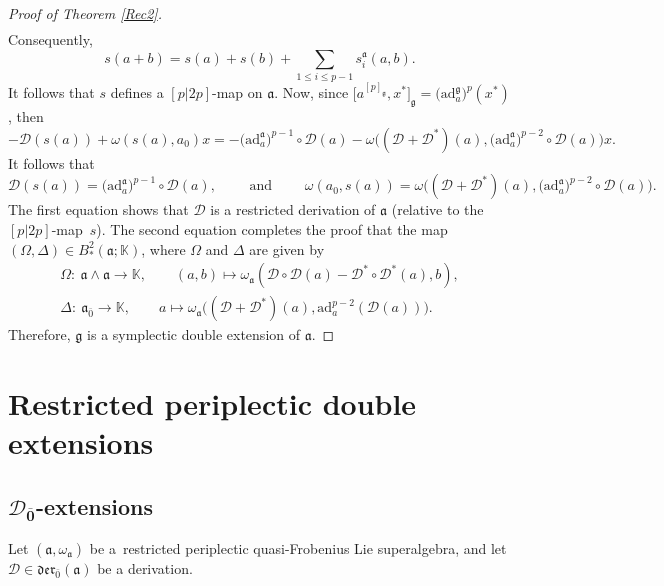\documentclass[10pt,a4paper]{amsart}
\numberwithin{equation}{section}
\begin{document}
\begin{proof}[Proof of Theorem \ref{Rec2}]
\begin{align*}
\end{align*}
Consequently,
\[
 s(a+b)=s(a)+s(b)+ \sum_{1\leq i \leq p-1}s_i^{\mathfrak{a}}(a,b).
\]
It follows that $s$ defines a $[p|2p]$-map on $\mathfrak{a}$. Now, since $\big[a^{[p]_\mathfrak{g}},x^*\big]_\mathfrak{g}=\bigl(\mathrm{ad}_a^\mathfrak{g}\bigr)^p(x^*)$, then
\[
-\mathscr D (s(a)) + \omega (s(a), a_0)x = - \bigl(\mathrm{ad}_a^\mathfrak{a}\bigr)^{p-1}\circ \mathscr D(a) - \omega \bigl(({\mathscr D}+{\mathscr D}^*)(a), \bigl(\mathrm{ad}_a^\mathfrak{a}\bigr)^{p-2} \circ {\mathscr D}(a)\bigr)x.
\]
It follows that
\[
\mathscr D (s(a)) = \bigl(\mathrm{ad}_a^\mathfrak{a}\bigr)^{p-1}\circ \mathscr D(a),\qquad \text{ and }\qquad
\omega(a_0, s(a)) = \omega \bigl(({\mathscr D}+{\mathscr D}^*)(a),\bigl(\mathrm{ad}_a^\mathfrak{a}\bigr)^{p-2} \circ {\mathscr D}(a)\bigr).
\]
The first equation shows that ${\mathscr D}$ is a restricted derivation of $\mathfrak{a}$ (relative to the $[p|2p]$-map~$s$). The second equation completes the proof that the map $(\Omega,\Delta)\in B^2_*(\mathfrak{a}; \mathbb{K})$, where $\Omega$ and $\Delta$ are given by
\begin{gather*}\label{EOOmega}
\Omega\colon\ \mathfrak{a}\wedge \mathfrak{a} \rightarrow \mathbb{K},\qquad (a,b) \mapsto \omega_\mathfrak{a}( {\mathscr D} \circ {\mathscr D}(a) - {\mathscr D}^* \circ {\mathscr D}^*(a) , b), \\
\Delta\colon\ \mathfrak{a}_{\bar 0} \rightarrow \mathbb{K},\qquad a \mapsto \omega_\mathfrak{a}\bigl(({\mathscr D}+{\mathscr D}^*)(a),\mathrm{ad}_a^{p-2}({\mathscr D}(a))\bigr).
\end{gather*}
Therefore, $\mathfrak g$ is a symplectic double extension of $\mathfrak{a}$.
\end{proof}

\section{Restricted periplectic double extensions}\label{sec4}

\subsection[D\_0-extensions]{$\boldsymbol{{\mathscr D}_{\bar 0}}$-extensions}\label{D0omega1}

Let $(\mathfrak{a}, \omega_\mathfrak{a})$ be a~restricted periplectic quasi-Frobenius Lie superalgebra, and let ${\mathscr D}\in \mathfrak{der}_{\bar 0}(\mathfrak{a})$ be a derivation.
\end{document}
